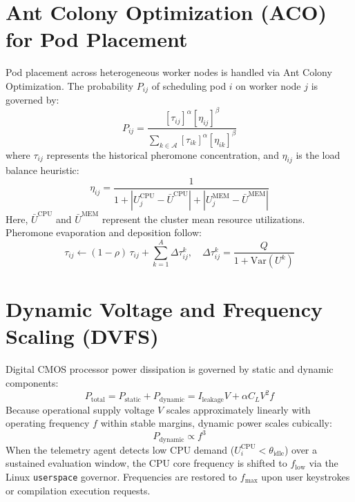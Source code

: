 \documentclass[12pt,a4paper]{report}
\begin{document}
	\section{Ant Colony Optimization (ACO) for Pod Placement}
	Pod placement across heterogeneous worker nodes is handled via Ant Colony Optimization. The probability $P_{ij}$ of scheduling pod $i$ on worker node $j$ is governed by:
	\begin{equation}
		P_{ij} = \frac{[\tau_{ij}]^\alpha [\eta_{ij}]^\beta}{\sum_{k \in \mathcal{A}} [\tau_{ik}]^\alpha [\eta_{ik}]^\beta}
	\end{equation}
	where $\tau_{ij}$ represents the historical pheromone concentration, and $\eta_{ij}$ is the load balance heuristic:
	\begin{equation}
		\eta_{ij} = \frac{1}{1 + |U_j^{\text{CPU}} - \bar{U}^{\text{CPU}}| + |U_j^{\text{MEM}} - \bar{U}^{\text{MEM}}|}
	\end{equation}
	Here, $\bar{U}^{\text{CPU}}$ and $\bar{U}^{\text{MEM}}$ represent the cluster mean resource utilizations. Pheromone evaporation and deposition follow:
	\begin{equation}
		\tau_{ij} \leftarrow (1 - \rho)\,\tau_{ij} + \sum_{k=1}^A \Delta \tau_{ij}^k, \quad \Delta \tau_{ij}^k = \frac{Q}{1 + \text{Var}(U^k)}
	\end{equation}
	
	\section{Dynamic Voltage and Frequency Scaling (DVFS)}
	Digital CMOS processor power dissipation is governed by static and dynamic components:
	\begin{equation}
		P_{\text{total}} = P_{\text{static}} + P_{\text{dynamic}} = I_{\text{leakage}} V + \alpha C_L V^2 f
	\end{equation}
	Because operational supply voltage $V$ scales approximately linearly with operating frequency $f$ within stable margins, dynamic power scales cubically:
	\begin{equation}
		P_{\text{dynamic}} \propto f^3
	\end{equation}
	When the telemetry agent detects low CPU demand ($U_i^{\text{CPU}} < \theta_{\text{idle}}$) over a sustained evaluation window, the CPU core frequency is shifted to $f_{\text{low}}$ via the Linux \texttt{userspace} governor. Frequencies are restored to $f_{\max}$ upon user keystrokes or compilation execution requests.
	
\end{document}
